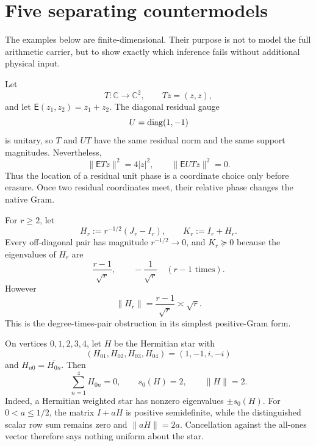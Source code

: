 \section{Five separating countermodels}
\label{sec:tpc68-countermodels}

The examples below are finite-dimensional.  Their purpose is not to model
the full arithmetic carrier, but to show exactly which inference fails
without additional physical input.

\begin{example}
\label{ex:tpc68-erasure-gauge}
Let
\[
 T:\mathbb C\longrightarrow\mathbb C^2,
 \qquad Tz=(z,z),
\]
and let \(\mathsf E(z_1,z_2)=z_1+z_2\).  The diagonal residual gauge
\[
 U=\operatorname{diag}(1,-1)
\]
is unitary, so \(T\) and \(UT\) have the same residual norm and the same
support magnitudes.  Nevertheless,
\[
 \|\mathsf ETz\|^2=4|z|^2,
 \qquad
 \|\mathsf EUTz\|^2=0.
\]
Thus the location of a residual unit phase is a coordinate choice only
before erasure.  Once two residual coordinates meet, their relative phase
changes the native Gram.
\end{example}

\begin{example}
\label{ex:tpc68-small-pairs-large-operator}
For \(r\ge2\), let
\[
 H_r:=r^{-1/2}(J_r-I_r),
 \qquad K_r:=I_r+H_r.
\]
Every off-diagonal pair has magnitude \(r^{-1/2}\to0\), and \(K_r\succeq0\)
because the eigenvalues of \(H_r\) are
\[
 \frac{r-1}{\sqrt r},
 \qquad -\frac1{\sqrt r}\quad(r-1\text{ times}).
\]
However
\[
 \|H_r\|=\frac{r-1}{\sqrt r}\asymp\sqrt r.
\]
This is the degree-times-pair obstruction in its simplest positive-Gram
form.
\end{example}

\begin{example}
\label{ex:tpc68-scalar-star-fails}
On vertices \(0,1,2,3,4\), let \(H\) be the Hermitian star with
\[
 (H_{01},H_{02},H_{03},H_{04})=(1,-1,i,-i)
\]
and \(H_{n0}=\overline{H_{0n}}\).  Then
\[
 \sum_{n=1}^4H_{0n}=0,
 \qquad
 s_0(H)=2,
 \qquad
 \|H\|=2.
\]
Indeed, a Hermitian weighted star has nonzero eigenvalues
\(\pm s_0(H)\).  For \(0<a\le1/2\), the matrix \(I+aH\) is positive
semidefinite, while the distinguished scalar row sum remains zero and
\(\|aH\|=2a\).  Cancellation against the all-ones vector therefore says
nothing uniform about the star.
\end{example}

